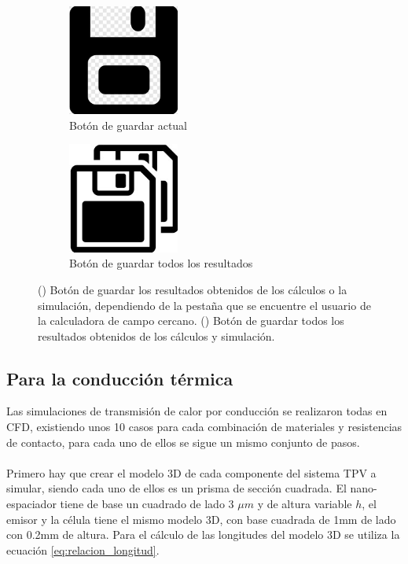 \begin{figure}[H]
	\centering
	\begin{subfigure}[b]{0.48\textwidth}
		\centering
		\includegraphics[width=0.4\textwidth]{figuras/Procedimiento_Simulaciones/Radiacion/SaveButton_Cut.jpg}
		\caption{Botón de guardar actual}
		\label{fig:SaveButton_Cut}
	\end{subfigure}
  \hfill
	\begin{subfigure}[b]{0.48\textwidth}
		\centering
			\includegraphics[width=0.40\textwidth]{figuras/Procedimiento_Simulaciones/Radiacion/SaveAllicon.jpg}
		\caption{Botón de guardar todos los resultados}
		\label{fig:SaveAllicon}
	\end{subfigure}
	\caption{() Botón de guardar los resultados obtenidos de los cálculos o la simulación, dependiendo de la pestaña que se encuentre el usuario de la calculadora de campo cercano. () Botón de guardar todos los resultados obtenidos de los cálculos y simulación.}
	\label{fig:saveButtons}
\end{figure}
\subsection{Para la conducción térmica}
Las simulaciones de transmisión de calor por conducción se realizaron todas en CFD, existiendo unos 10 casos para cada combinación de materiales y resistencias de contacto, para cada uno de ellos se sigue un mismo conjunto de pasos. \\\\
Primero hay que crear el modelo 3D de cada componente del sistema TPV a simular, siendo cada uno de ellos es un prisma de sección cuadrada. El nano-espaciador tiene de base un cuadrado de lado 3 $\mu m$ y de altura variable $h$, el emisor y la célula tiene el mismo modelo 3D, con base cuadrada de 1mm de lado con 0.2mm de altura. Para el cálculo de las longitudes del modelo 3D se utiliza la ecuación \ref{eq:relacion_longitud}.
